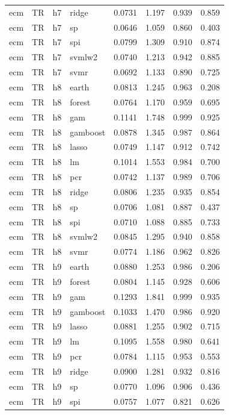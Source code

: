 \begin{ThreePartTable}
\begin{longtable}[t]{llclcccc}
ecm & TR & h7 & ridge & 0.0731 & 1.197 & 0.939 & 0.859\\
ecm & TR & h7 & sp & 0.0646 & 1.059 & 0.860 & 0.403\\
ecm & TR & h7 & spi & 0.0799 & 1.309 & 0.910 & 0.874\\
ecm & TR & h7 & svmlw2 & 0.0740 & 1.213 & 0.942 & 0.885\\
ecm & TR & h7 & svmr & 0.0692 & 1.133 & 0.890 & 0.725\\
\addlinespace
ecm & TR & h8 & earth & 0.0813 & 1.245 & 0.963 & 0.208\\
ecm & TR & h8 & forest & 0.0764 & 1.170 & 0.959 & 0.695\\
ecm & TR & h8 & gam & 0.1141 & 1.748 & 0.999 & 0.925\\
ecm & TR & h8 & gamboost & 0.0878 & 1.345 & 0.987 & 0.864\\
ecm & TR & h8 & lasso & 0.0749 & 1.147 & 0.912 & 0.742\\
ecm & TR & h8 & lm & 0.1014 & 1.553 & 0.984 & 0.700\\
ecm & TR & h8 & pcr & 0.0742 & 1.137 & 0.989 & 0.706\\
ecm & TR & h8 & ridge & 0.0806 & 1.235 & 0.935 & 0.854\\
ecm & TR & h8 & sp & 0.0706 & 1.081 & 0.887 & 0.437\\
ecm & TR & h8 & spi & 0.0710 & 1.088 & 0.885 & 0.733\\
ecm & TR & h8 & svmlw2 & 0.0845 & 1.295 & 0.940 & 0.858\\
ecm & TR & h8 & svmr & 0.0774 & 1.186 & 0.962 & 0.826\\
\addlinespace
ecm & TR & h9 & earth & 0.0880 & 1.253 & 0.986 & 0.206\\
ecm & TR & h9 & forest & 0.0804 & 1.145 & 0.928 & 0.606\\
ecm & TR & h9 & gam & 0.1293 & 1.841 & 0.999 & 0.935\\
ecm & TR & h9 & gamboost & 0.1033 & 1.470 & 0.986 & 0.920\\
ecm & TR & h9 & lasso & 0.0881 & 1.255 & 0.902 & 0.715\\
ecm & TR & h9 & lm & 0.1095 & 1.558 & 0.980 & 0.641\\
ecm & TR & h9 & pcr & 0.0784 & 1.115 & 0.953 & 0.553\\
ecm & TR & h9 & ridge & 0.0900 & 1.281 & 0.932 & 0.816\\
ecm & TR & h9 & sp & 0.0770 & 1.096 & 0.906 & 0.436\\
ecm & TR & h9 & spi & 0.0757 & 1.077 & 0.821 & 0.626\\

\end{longtable}
\end{ThreePartTable}
